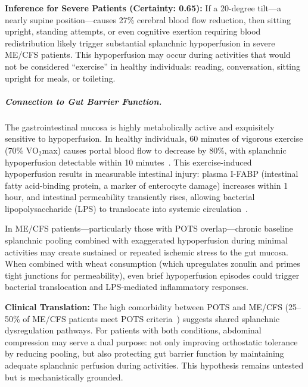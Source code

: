 \textbf{Inference for Severe Patients (Certainty: 0.65):} If a 20-degree tilt---a nearly supine position---causes 27\% cerebral blood flow reduction, then sitting upright, standing attempts, or even cognitive exertion requiring blood redistribution likely trigger substantial splanchnic hypoperfusion in severe ME/CFS patients. This hypoperfusion may occur during activities that would not be considered ``exercise'' in healthy individuals: reading, conversation, sitting upright for meals, or toileting.

\subparagraph{Connection to Gut Barrier Function.}
The gastrointestinal mucosa is highly metabolically active and exquisitely sensitive to hypoperfusion. In healthy individuals, 60 minutes of vigorous exercise (70\% VO$_2$max) causes portal blood flow to decrease by 80\%, with splanchnic hypoperfusion detectable within 10 minutes~\cite{vanWijck2011}. This exercise-induced hypoperfusion results in measurable intestinal injury: plasma I-FABP (intestinal fatty acid-binding protein, a marker of enterocyte damage) increases within 1 hour, and intestinal permeability transiently rises, allowing bacterial lipopolysaccharide (LPS) to translocate into systemic circulation~\cite{vanWijck2011}.

In ME/CFS patients---particularly those with POTS overlap---chronic baseline splanchnic pooling combined with exaggerated hypoperfusion during minimal activities may create sustained or repeated ischemic stress to the gut mucosa. When combined with wheat consumption (which upregulates zonulin and primes tight junctions for permeability), even brief hypoperfusion episodes could trigger bacterial translocation and LPS-mediated inflammatory responses.

\textbf{Clinical Translation:} The high comorbidity between POTS and ME/CFS (25--50\% of ME/CFS patients meet POTS criteria~\cite{Newton2008POTSprevalence}) suggests shared splanchnic dysregulation pathways. For patients with both conditions, abdominal compression may serve a dual purpose: not only improving orthostatic tolerance by reducing pooling, but also protecting gut barrier function by maintaining adequate splanchnic perfusion during activities. This hypothesis remains untested but is mechanistically grounded.

